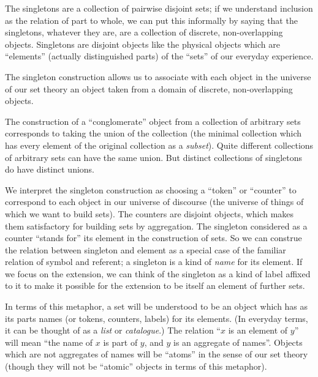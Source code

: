 The singletons are a collection of pairwise disjoint sets; if
we understand inclusion as the relation of part to whole, we can put this
informally by saying that the singletons, whatever they are,
are a collection of discrete, non-overlapping objects.  Singletons are
disjoint objects like the physical objects which are ``elements''
(actually distinguished parts) of the ``sets''
of our everyday experience.

The singleton construction allows us to associate with each object in
the universe of our set theory an object taken from a domain of
discrete, non-overlapping objects.

The construction of a ``conglomerate'' object from a collection of
arbitrary sets corresponds to taking the union of the
collection (the minimal collection which has every element of the original
collection as a {\itshape subset\/}).  Quite different
collections of arbitrary sets can have the same union.  But distinct
collections of singletons do have distinct unions.

We interpret the singleton construction as choosing a ``token'' or
``counter'' to correspond to each object in our universe of discourse
(the universe of things of which we want to build sets).  The counters
are disjoint objects, which makes them satisfactory for
building sets by aggregation.  The singleton considered as a counter ``stands
for'' its element in the construction of sets.  So we can construe the
relation between singleton and element as a
special case of the familiar relation of symbol and referent; a singleton is a
kind of {\itshape name\/} for its element.  If we focus on the extension, we
can think of the singleton as a kind of label affixed to it to make it
possible for the extension to be itself an element of further sets.

In terms of this metaphor, a set will be understood to be an object
which has as its parts names (or tokens,
counters, labels) for its elements.  (In everyday terms, it can be thought of
as a {\itshape list\/} or {\itshape catalogue\/}.)  The
relation ``$x$ is an element of $y$'' will 
mean ``the name of $x$ is part of $y$, and $y$ is an aggregate of
names''.  Objects which are not aggregates of names will be
``atoms'' in the sense of our set theory (though they will not be
``atomic'' objects in terms of this metaphor).

